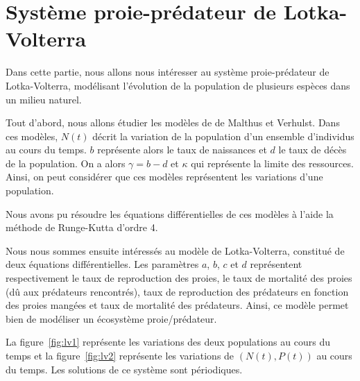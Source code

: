 \section*{Système proie-prédateur de Lotka-Volterra}

Dans cette partie, nous allons nous intéresser au système proie-prédateur de Lotka-Volterra, modélisant l'évolution de la population de plusieurs espèces dans un milieu naturel.
\vskip 1mm ~

Tout d'abord, nous allons étudier les modèles de de Malthus et Verhulst. Dans ces modèles, $N(t)$ décrit la variation de la population d'un ensemble d'individus au cours du temps. $b$ représente alors le taux de naissances et $d$ le taux de décès de la population. On a alors $\gamma =b-d$ et $\kappa$ qui représente la limite des ressources. Ainsi, on peut considérer que ces modèles représentent les variations d’une population.

Nous avons pu résoudre les équations différentielles de ces modèles à l'aide la méthode de Runge-Kutta d'ordre 4.
\vskip 1mm ~

Nous nous sommes ensuite intéressés au modèle de Lotka-Volterra, constitué de deux équations différentielles. Les paramètres $a$, $b$, $c$ et $d$ représentent respectivement le taux de reproduction des proies, le taux de mortalité des proies (dû aux prédateurs rencontrés), taux de reproduction des prédateurs en fonction des proies mangées et taux de mortalité des prédateurs. Ainsi, ce modèle permet bien de modéliser un écosystème proie/prédateur.

La figure~\ref{fig:lv1} représente les variations des deux populations au cours du temps et la figure~\ref{fig:lv2} représente les variations de $(N(t), P(t))$ au cours du temps. Les solutions de ce système sont périodiques.

